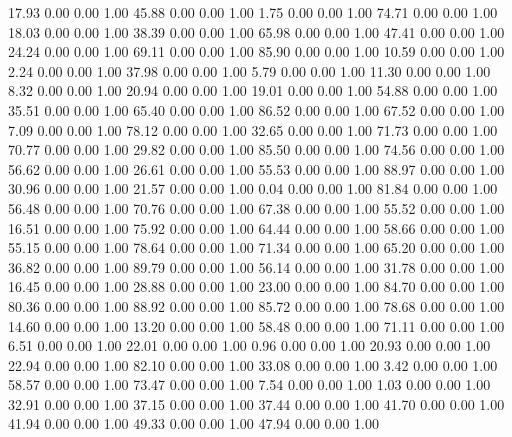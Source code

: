    17.93   0.00   0.00   1.00
   45.88   0.00   0.00   1.00
    1.75   0.00   0.00   1.00
   74.71   0.00   0.00   1.00
   18.03   0.00   0.00   1.00
   38.39   0.00   0.00   1.00
   65.98   0.00   0.00   1.00
   47.41   0.00   0.00   1.00
   24.24   0.00   0.00   1.00
   69.11   0.00   0.00   1.00
   85.90   0.00   0.00   1.00
   10.59   0.00   0.00   1.00
    2.24   0.00   0.00   1.00
   37.98   0.00   0.00   1.00
    5.79   0.00   0.00   1.00
   11.30   0.00   0.00   1.00
    8.32   0.00   0.00   1.00
   20.94   0.00   0.00   1.00
   19.01   0.00   0.00   1.00
   54.88   0.00   0.00   1.00
   35.51   0.00   0.00   1.00
   65.40   0.00   0.00   1.00
   86.52   0.00   0.00   1.00
   67.52   0.00   0.00   1.00
    7.09   0.00   0.00   1.00
   78.12   0.00   0.00   1.00
   32.65   0.00   0.00   1.00
   71.73   0.00   0.00   1.00
   70.77   0.00   0.00   1.00
   29.82   0.00   0.00   1.00
   85.50   0.00   0.00   1.00
   74.56   0.00   0.00   1.00
   56.62   0.00   0.00   1.00
   26.61   0.00   0.00   1.00
   55.53   0.00   0.00   1.00
   88.97   0.00   0.00   1.00
   30.96   0.00   0.00   1.00
   21.57   0.00   0.00   1.00
    0.04   0.00   0.00   1.00
   81.84   0.00   0.00   1.00
   56.48   0.00   0.00   1.00
   70.76   0.00   0.00   1.00
   67.38   0.00   0.00   1.00
   55.52   0.00   0.00   1.00
   16.51   0.00   0.00   1.00
   75.92   0.00   0.00   1.00
   64.44   0.00   0.00   1.00
   58.66   0.00   0.00   1.00
   55.15   0.00   0.00   1.00
   78.64   0.00   0.00   1.00
   71.34   0.00   0.00   1.00
   65.20   0.00   0.00   1.00
   36.82   0.00   0.00   1.00
   89.79   0.00   0.00   1.00
   56.14   0.00   0.00   1.00
   31.78   0.00   0.00   1.00
   16.45   0.00   0.00   1.00
   28.88   0.00   0.00   1.00
   23.00   0.00   0.00   1.00
   84.70   0.00   0.00   1.00
   80.36   0.00   0.00   1.00
   88.92   0.00   0.00   1.00
   85.72   0.00   0.00   1.00
   78.68   0.00   0.00   1.00
   14.60   0.00   0.00   1.00
   13.20   0.00   0.00   1.00
   58.48   0.00   0.00   1.00
   71.11   0.00   0.00   1.00
    6.51   0.00   0.00   1.00
   22.01   0.00   0.00   1.00
    0.96   0.00   0.00   1.00
   20.93   0.00   0.00   1.00
   22.94   0.00   0.00   1.00
   82.10   0.00   0.00   1.00
   33.08   0.00   0.00   1.00
    3.42   0.00   0.00   1.00
   58.57   0.00   0.00   1.00
   73.47   0.00   0.00   1.00
    7.54   0.00   0.00   1.00
    1.03   0.00   0.00   1.00
   32.91   0.00   0.00   1.00
   37.15   0.00   0.00   1.00
   37.44   0.00   0.00   1.00
   41.70   0.00   0.00   1.00
   41.94   0.00   0.00   1.00
   49.33   0.00   0.00   1.00
   47.94   0.00   0.00   1.00
